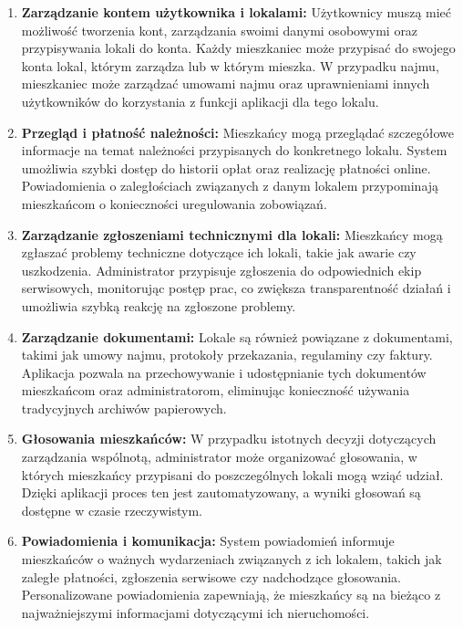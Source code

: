 \begin{enumerate}[label=\arabic*.] 

	\item \textbf{Zarządzanie kontem użytkownika i lokalami:} Użytkownicy muszą mieć możliwość tworzenia kont, zarządzania swoimi danymi osobowymi oraz przypisywania lokali do konta. Każdy mieszkaniec może przypisać do swojego konta lokal, którym zarządza lub w którym mieszka. W przypadku najmu, mieszkaniec może zarządzać umowami najmu oraz uprawnieniami innych użytkowników do korzystania z funkcji aplikacji dla tego lokalu.
	
	\item \textbf{Przegląd i płatność należności:} Mieszkańcy mogą przeglądać szczegółowe informacje na temat należności przypisanych do konkretnego lokalu. System umożliwia szybki dostęp do historii opłat oraz realizację płatności online. Powiadomienia o zaległościach związanych z danym lokalem przypominają mieszkańcom o konieczności uregulowania zobowiązań.

	\item \textbf{Zarządzanie zgłoszeniami technicznymi dla lokali:} Mieszkańcy mogą zgłaszać problemy techniczne dotyczące ich lokali, takie jak awarie czy uszkodzenia. Administrator przypisuje zgłoszenia do odpowiednich ekip serwisowych, monitorując postęp prac, co zwiększa transparentność działań i umożliwia szybką reakcję na zgłoszone problemy.
	
	\item \textbf{Zarządzanie dokumentami:} Lokale są również powiązane z dokumentami, takimi jak umowy najmu, protokoły przekazania, regulaminy czy faktury. Aplikacja pozwala na przechowywanie i udostępnianie tych dokumentów mieszkańcom oraz administratorom, eliminując konieczność używania tradycyjnych archiwów papierowych.
	
	\item \textbf{Głosowania mieszkańców:} W przypadku istotnych decyzji dotyczących zarządzania wspólnotą, administrator może organizować głosowania, w których mieszkańcy przypisani do poszczególnych lokali mogą wziąć udział. Dzięki aplikacji proces ten jest zautomatyzowany, a wyniki głosowań są dostępne w czasie rzeczywistym.
	
	\item \textbf{Powiadomienia i komunikacja:} System powiadomień informuje mieszkańców o ważnych wydarzeniach związanych z ich lokalem, takich jak zaległe płatności, zgłoszenia serwisowe czy nadchodzące głosowania. Personalizowane powiadomienia zapewniają, że mieszkańcy są na bieżąco z najważniejszymi informacjami dotyczącymi ich nieruchomości.


\end{enumerate}
